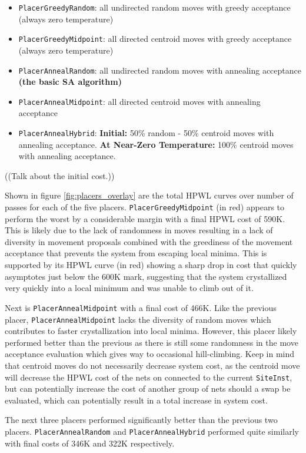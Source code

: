\begin{itemize}
    \item \texttt{PlacerGreedyRandom}: all undirected random moves with greedy acceptance (always zero temperature)
    \item \texttt{PlacerGreedyMidpoint}: all directed centroid moves with greedy acceptance (always zero temperature)
    \item \texttt{PlacerAnnealRandom}: all undirected random moves with annealing acceptance \textbf{(the basic SA algorithm)}
    \item \texttt{PlacerAnnealMidpoint}: all directed centroid moves with annealing acceptance
    \item \texttt{PlacerAnnealHybrid}: \textbf{Initial:} 50\% random - 50\% centroid moves with annealing acceptance. \textbf{At Near-Zero Temperature:} 100\% centroid moves with annealing acceptance.
\end{itemize}

((Talk about the initial cost.))

Shown in figure \ref{fig:placers_overlay} are the total HPWL curves over number of passes for each of the five placers. 
\texttt{PlacerGreedyMidpoint} (in red) appears to perform the worst by a considerable margin with a final HPWL cost of 590K.
This is likely due to the lack of randomness in moves resulting in a lack of diversity in movement proposals combined with the greediness of the movement acceptance that prevents the system from escaping local minima.
This is supported by its HPWL curve (in red) showing a sharp drop in cost that quickly asymptotes just below the 600K mark, suggesting that the system crystallized very quickly into a local minimum and was unable to climb out of it.

Next is \texttt{PlacerAnnealMidpoint} with a final cost of 466K.
Like the previous placer, \texttt{PlacerAnnealMidpoint} lacks the diversity of random moves which contributes to faster crystallization into local minima.
However, this placer likely performed better than the previous as there is still some randomness in the move acceptance evaluation which gives way to occasional hill-climbing. 
Keep in mind that centroid moves do not necessarily decrease system cost, as the centroid move will decrease the HPWL cost of the nets on connected to the current \texttt{SiteInst}, but can potentially increase the cost of another group of nets should a swap be evaluated, which can potentially result in a total increase in system cost.

The next three placers performed significantly better than the previous two placers.
\texttt{PlacerAnnealRandom} and \texttt{PlacerAnnealHybrid} performed quite similarly with final costs of 346K and 322K respectively. 

